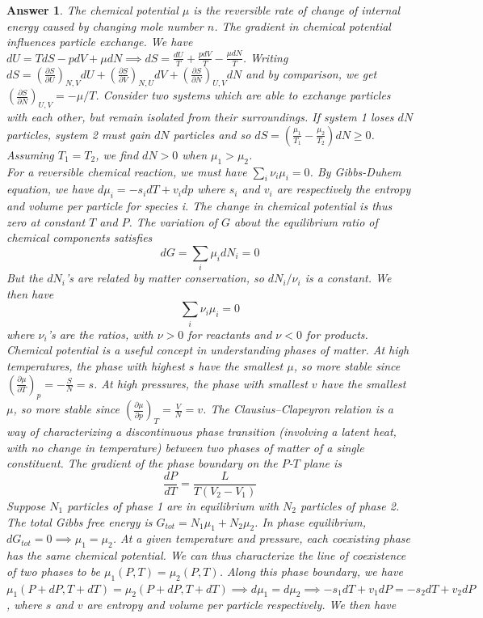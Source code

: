 \documentclass[a4paper]{article}
\newtheorem{ans}{Answer}[section]
\theoremstyle{new}
\begin{document}
\begin{ans}
The chemical potential $\mu$ is the reversible rate of change of internal energy caused by changing mole number $n$. The gradient in chemical potential influences particle exchange. We have $dU=TdS-pdV+\mu dN\implies dS=\frac{dU}{T}+\frac{pdV}{T}-\frac{\mu dN}{T}$. Writing $dS=(\frac{\partial S}{\partial U})_{N,V}dU+(\frac{\partial S}{\partial V})_{N,U}dV+(\frac{\partial S}{\partial N})_{U,V}dN$ and by comparison, we get $(\frac{\partial S}{\partial N})_{U,V}=-\mu/T$. Consider two systems which are able to exchange particles with each other, but remain isolated from their surroundings. If system 1 loses $dN$ particles, system 2 must gain $dN$ particles and so $dS=(\frac{\mu_1}{T_1}-\frac{\mu_2}{T_2})dN\geq0$. Assuming $T_1=T_2$, we find $dN>0$ when $\mu_1>\mu_2$.\\[5pt]
For a reversible chemical reaction, we must have $\sum_i\nu_i\mu_i=0$. By Gibbs-Duhem equation, we have $d\mu_i=-s_idT+v_idp$ where $s_i$ and $v_i$ are respectively the entropy and volume per particle for species i. The change in chemical potential is thus zero at constant $T$ and $P$. The variation of $G$ about the equilibrium ratio of chemical components satisfies
$$dG=\sum_i\mu_idN_i=0$$
But the $dN_i$'s are related by matter conservation, so $dN_i/\nu_i$ is a constant. We then have 
$$\sum_i\nu_i\mu_i=0$$
where $\nu_i$'s are the ratios, with $\nu>0$ for reactants and $\nu<0$ for products.\\[5pt]
Chemical potential is a useful concept in understanding phases of matter. At high temperatures, the phase with highest $s$ have the smallest $\mu$, so more stable since $(\frac{\partial\mu}{\partial T})_p=-\frac{S}{N}=s$. At high pressures, the phase with smallest $v$ have the smallest $\mu$, so more stable since $(\frac{\partial\mu}{\partial p})_T=\frac{V}{N}=v$. The Clausius–Clapeyron relation is a way of characterizing a discontinuous phase transition (involving a latent heat, with no change in temperature) between two phases of matter of a single constituent. The gradient of the phase boundary on the $P$-$T$ plane is
$$\frac{dP}{dT}=\frac{L}{T(V_2-V_1)}$$ 
Suppose $N_1$ particles of phase 1 are in equilibrium with $N_2$ particles of phase 2. The total Gibbs free energy is $G_{tot}=N_1\mu_1+N_2\mu_2$. In phase equilibrium, $dG_{tot}=0\implies\mu_1=\mu_2$. At a given temperature and pressure, each coexisting phase has the same chemical potential. We can thus characterize the line of coexistence of two phases to be $\mu_1(P,T)=\mu_2(P,T)$. Along this phase boundary, we have $\mu_1(P+dP,T+dT)=\mu_2(P+dP,T+dT)\implies d\mu_1=d\mu_2\implies -s_1dT+v_1dP=-s_2dT+v_2dP$, where $s$ and $v$ are entropy and volume per particle respectively. We then have 

\end{ans}
\end{document}

